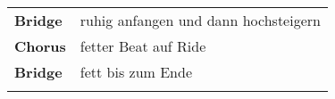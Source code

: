 \begin{tabular}{p{1.6cm}l}
	\textbf{Bridge} & ruhig anfangen und dann hochsteigern \\
	\textbf{Chorus} & fetter Beat auf Ride                 \\
	\textbf{Bridge} & fett bis zum Ende                    \\
	                &                                      \\
\end{tabular}
